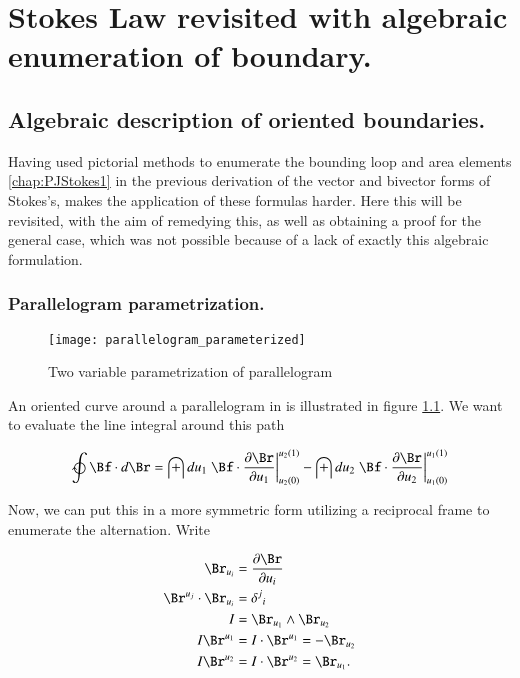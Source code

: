 
\chapter{Stokes Law revisited with algebraic enumeration of boundary.}\label{chap:PJStokes2}
\section{Algebraic description of oriented boundaries. }

Having used pictorial methods to enumerate the bounding loop and area elements 
\ref{chap:PJStokes1}
in the previous derivation
of the vector and bivector forms of Stokes's, makes the application
of these formulas harder.  Here this will be revisited, with the aim of remedying this, as well as
obtaining a proof for the general case, which was not possible because of a lack of exactly this
algebraic formulation.

\subsection{Parallelogram parametrization. }

\begin{figure}[htp]
\centering
\texttt{[image: parallelogram\_parameterized]}
\caption{Two variable parametrization of  parallelogram}\label{fig:parallelogram}
\end{figure}

An oriented curve around a parallelogram in  is illustrated in figure 
\ref{fig:parallelogram}.  We want to evaluate the line integral around this
path

\begin{align}\label{eqn:stokesR:lineprep}
\ointclockwise \Bf \cdot d\Br
&=
\int du_1 \left.{\Bf \cdot \PD{u_1}{\Br} }\right\vert_{u_2(0)}^{u_2(1)}
-\int du_2 \left.{\Bf \cdot \PD{u_2}{\Br} }\right\vert_{u_1(0)}^{u_1(1)} \\
\end{align}

Now, we can put this in a more symmetric form utilizing a reciprocal 
frame to enumerate the alternation.  Write

\begin{align*}
\Br_{u_i} &= \PD{u_i}{\Br} \\
\Br^{u_j} \cdot \Br_{u_i} &= {\delta^j}_i \\
I &= \Br_{u_1} \wedge \Br_{u_2} \\
I \Br^{u_1} &=
I \cdot \Br^{u_1} =
- \Br_{u_2} \\
I \Br^{u_2} &=
I \cdot \Br^{u_2} =
 \Br_{u_1}.
\end{align*}

